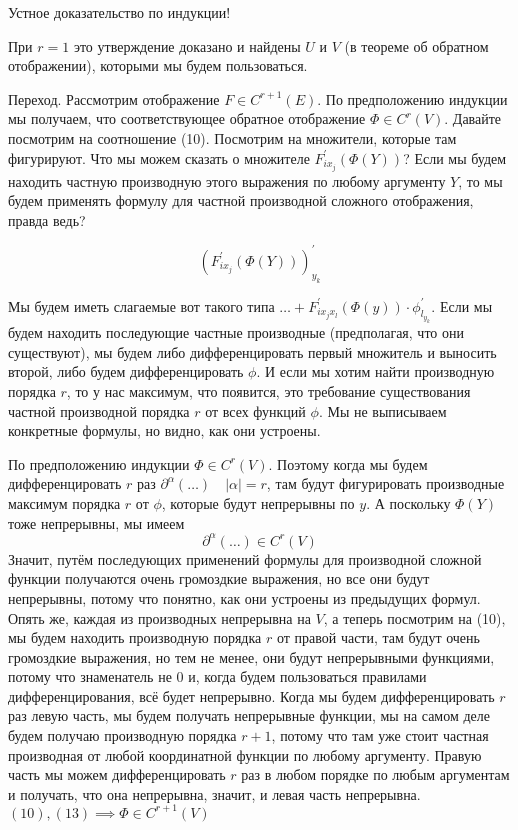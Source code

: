 \documentclass[main]{subfiles}
\begin{document}
        \begin{longProof}
            Устное доказательство по индукции!

            При $r=1$ это утверждение доказано и найдены $U$ и $V$ (в теореме об обратном отображении), которыми мы будем пользоваться.

            Переход. Рассмотрим отображение $F \in C^{r+1}(E)$. По предположению индукции мы получаем,
            что соответствующее обратное отображение $\Phi \in C^r(V)$. Давайте посмотрим на соотношение (10). Посмотрим
            на множители, которые там фигурируют. Что мы можем сказать о множителе $F^\prime_{ix_j}(\Phi(Y))$? Если
            мы будем находить частную производную этого выражения по любому аргументу $Y$, то мы будем применять
            формулу для частной производной сложного отображения, правда ведь?
            
            \[ (F^\prime_{ix_j}(\Phi(Y)))^\prime_{y_k}\]

            Мы будем иметь слагаемые вот такого типа $\ldots + F^\prime_{ix_j x_l}(\Phi(y)) \cdot \phi^\prime_{l_{y_k}}$.
            Если мы будем  находить последующие частные производные (предполагая, что они существуют), мы будем либо дифференцировать первый множитель и выносить второй, либо
            будем дифференцировать $\phi$. И если мы хотим найти производную порядка $r$, то у нас максимум, что появится,
            это требование существования  частной производной порядка $r$ от всех функций $\phi$. Мы не выписываем конкретные формулы,
            но видно, как они устроены.
            
            По предположению индукции $\Phi \in C^r(V)$. Поэтому когда мы будем дифференцировать $r$ раз
            $\partial^\alpha(\ldots) \quad |\alpha| = r$, там будут фигурировать производные максимум порядка $r$ от $\phi$, которые
            будут непрерывны по $y$. А поскольку $\Phi(Y)$ тоже непрерывны, мы имеем \[\partial^\alpha(\ldots) \in C^r(V) \tag{13}\]
             Значит,
            путём последующих применений формулы для производной сложной функции получаются очень громоздкие выражения, но все они будут непрерывны,
            потому что понятно, как они устроены из предыдущих формул. Опять же, каждая из производных непрерывна на $V$,
            а теперь посмотрим на (10), мы будем находить производную порядка $r$ от правой части, там будут очень громоздкие выражения, но тем не менее,
            они будут непрерывными функциями, потому что знаменатель не 0 и, когда будем пользоваться правилами дифференцирования, всё будет непрерывно.
            Когда мы будем дифференцировать $r$ раз левую часть, мы будем получать непрерывные функции, мы на самом деле будем
            получаю производную порядка $r+1$, потому что там уже стоит частная производная от любой координатной функции по любому аргументу.
            Правую часть мы можем дифференцировать $r$ раз в любом порядке по любым аргументам и получать, что она непрерывна,
            значит, и левая часть непрерывна.
            $(10), (13) \implies \Phi \in C^{r+1}(V)$
        \end{longProof}
\end{document}
